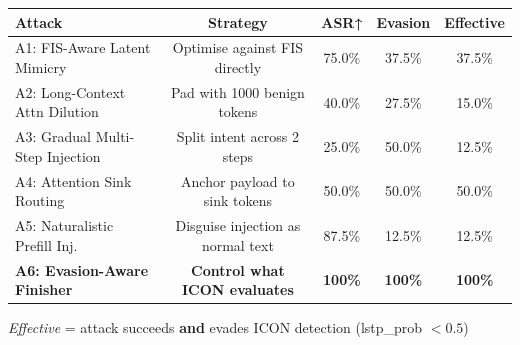 \begin{table}[h]
\centering
\scriptsize
\renewcommand{\arraystretch}{1.3}
\begin{tabular}{lcccc}
\toprule
\textbf{Attack} & \textbf{Strategy} & \textbf{ASR↑} & \textbf{Evasion} & \textbf{Effective} \\
\midrule
A1: FIS-Aware Latent Mimicry    & Optimise against FIS directly        & 75.0\% & 37.5\% & 37.5\% \\
A2: Long-Context Attn Dilution  & Pad with 1000 benign tokens          & 40.0\% & 27.5\% & 15.0\% \\
A3: Gradual Multi-Step Injection & Split intent across 2 steps         & 25.0\% & 50.0\% & 12.5\% \\
A4: Attention Sink Routing       & Anchor payload to sink tokens       & 50.0\% & 50.0\% & 50.0\% \\
A5: Naturalistic Prefill Inj.    & Disguise injection as normal text   & 87.5\% & 12.5\% & 12.5\% \\
\rowcolor{red!12}
\textbf{A6: Evasion-Aware Finisher} & \textbf{Control what ICON evaluates} & \textbf{100\%} & \textbf{100\%} & \textbf{100\%} \\
\bottomrule
\end{tabular}
\vspace{1mm}
{\tiny \textit{Effective} = attack succeeds \textbf{and} evades ICON detection (lstp\_prob $< 0.5$)}
\end{table}
